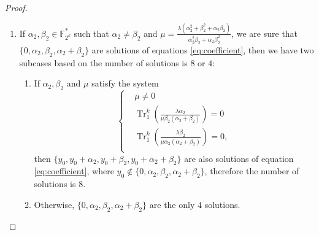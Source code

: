 \documentclass{article}
\newcommand{\F}{\mathbb{F}}
\newcommand{\0}{\textbf{0}}
\newcommand{\1}{\textbf{1}}
\newcommand{\TRACE}{\operatorname{Tr}_1^k}
\theoremstyle{plain}
\begin{document}
\begin{proof}
\begin{enumerate}[label=\textbf{Case \arabic*},wide = 0pt]
        \item 
    If $ \alpha_2,\beta_2\in\F_{2^k}^* $ such that $ \alpha_2\ne\beta_2 $ and   
    $ \mu= \frac{\lambda(\alpha_2^2+\beta_2^2+\alpha_2\beta_2)}{\alpha_2^2\beta_2+\alpha_2\beta_2^2}$, 
    we are sure that $ \{0,\alpha_2,\beta_2,\alpha_2+\beta_2\} $ are solutions of equations \eqref{eq:coefficient}, 
    then we have two subcases based on the number of solutions is $ 8 $ or $ 4 $: 
    \begin{enumerate}[label=(\arabic{*})]
        \item If $ \alpha_2,\beta_2 $ and $ \mu $ satisfy the system 
        \begin{equation}\label{eq:last_four_solution_condition}\left\{
            \begin{alignedat}{3}
                &\mu\ne 0\\
                &\TRACE\left(\frac{\lambda\alpha_2}{\mu\beta_2(\alpha_2+\beta_2)}\right)=0\\
                &\TRACE\left(\frac{\lambda\beta_2}{\mu\alpha_2(\alpha_2+\beta_2)}\right)=0,\\
            \end{alignedat}\right.
        \end{equation}
        then $ \{y_0,y_0+\alpha_2,y_0+\beta_2,y_0+\alpha_2+\beta_2\} $ are also solutions of equation \eqref{eq:coefficient}, 
        where $ y_0\notin\{0,\alpha_2,\beta_2,\alpha_2+\beta_2\} $, 
        therefore the number of solutions is $ 8 $.
        \item Otherwise, $ \{0,\alpha_2,\beta_2,\alpha_2+\beta_2\} $ are the only $ 4 $ solutions. 
    \end{enumerate}



\end{enumerate}
\end{proof}
\end{document}
